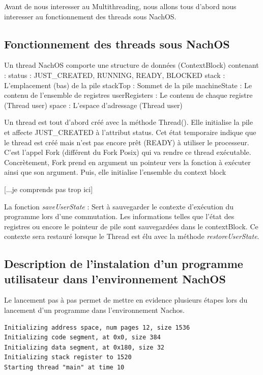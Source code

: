 \documentclass[a4paper,10pt]{article}
\begin{document}
Avant de nous interesser au Multithreading, nous allons tous d'abord nous
interesser au fonctionnement des threads sous NachOS.

\subsection{Fonctionnement des threads sous NachOS}

Un thread NachOS comporte une structure de données (ContextBlock) contenant :
status : JUST_CREATED, RUNNING, READY, BLOCKED
stack : L'emplacement (bas) de la pile
stackTop : Sommet de la pile
machineState : Le contenu de l'ensemble de registres
userRegisters : Le contenu de chaque registre (Thread user)
space : L'espace d'adressage (Thread user)

Un thread est tout d'abord créé avec la méthode Thread(). Elle initialise la
pile et affecte JUST_CREATED à l'attribut status. Cet état temporaire indique
que le thread est créé mais n'est pas encore prêt (READY) à utiliser le
processeur. C'est l'appel Fork (différent du Fork Posix) qui va rendre ce
thread exécutable. Concrètement, Fork prend en argument un pointeur vers la
fonction à exécuter ainsi que son argument. Puis, elle initialise l'ensemble du
context block 

[...je comprends pas trop ici]

La fonction \textit{saveUserState} : Sert à sauvegarder le contexte d'exécution
du programme lors d'une commutation. Les informations telles que l'état des
registres ou encore le pointeur de pile sont sauvegardées dans le contextBlock.
Ce contexte sera restauré lorsque le Thread est élu avec la méthode
\textit{restoreUserState}.

\subsection{Description de l'instalation d'un programme utilisateur dans
l'environnement NachOS}

Le lancement pas à pas permet de mettre en evidence plusieurs étapes lors du
lancement d'un programme dans l'environnement Nachos.

\begin{lstlisting}
Initializing address space, num pages 12, size 1536
Initializing code segment, at 0x0, size 384
Initializing data segment, at 0x180, size 32
Initializing stack register to 1520
Starting thread "main" at time 10
\end{lstlisting}
\end{document}
